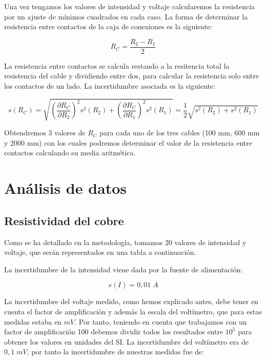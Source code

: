 \documentclass[a4paper,12pt,titlepage]{report}
\begin{document}
\par Una vez tengamos los valores de intensidad y voltaje calcularemos la resistencia por un ajuste de mínimos cuadrados en cada caso. La forma de determinar la resistencia entre contactos de la caja de conexiones es la siguiente:

\begin{equation}
    R_{C} = \frac{R_{2}-R_{1}}{2}
    \label{Resistencia contactos}
\end{equation}

La resistencia entre contactos se calcula restando a la resitencia total la resistencia del cable y dividiendo entre dos, para calcular la resistencia solo entre los contactos de un lado. La incertidumbre asociada es la siguiente:

\begin{equation}
    s(R_{C}) = \sqrt{\left (\frac{\partial R_{C}}{\partial R_{2}}\right )^2s^2(R_{2})  +  \left (\frac{\partial R_{C}}{\partial R_{1}}\right )^2s^2(R_{1})} = \frac{1}{2}\sqrt{s^2(R_{2})  +  s^2(R_{1})}
    \label{Inc Resistencia caja}
\end{equation}

Obtendremos 3 valores de $R_{C}$ para cada uno de los tres cables (100 mm, 600 mm y 2000 mm) con los cuales podremos determinar el valor de la resistencia entre contactos calculando su media aritmética.

\newpage

\section{Análisis de datos}

\subsection{Resistividad del cobre}

Como se ha detallado en la metodología, tomamos 20 valores de intensidad y voltaje, que serán representados en una tabla a continuación.

\par La incertidumbre de la intensidad viene dada por la fuente de alimentación:

\begin{equation}
    s(I) = 0,01 \; A
\end{equation}

La incertidumbre del voltaje medido, como hemos explicado antes, debe tener en cuenta el factor de amplificación y además la escala del voltímetro, que para estas medidas estaba en $mV$. Por tanto, teniendo en cuenta que trabajamos con un factor de amplificación 100 debemos dividir todos los resultados entre $10^5$ para obtener los valores en unidades del SI. La incertidumbre del voltímetro era de $0,1 \; mV$, por tanto la incertidumbre de nuestras medidas fue de:
\end{document}
